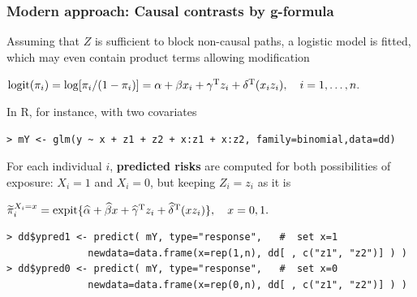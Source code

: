 \documentclass[12pt,dvipsnames,t,aspectratio=169, handout%
]{beamer}
\begin{document}
\begin{frame}[fragile]
\frametitle{\large Modern approach: Causal contrasts by g-formula}

\bi
\item
Assuming that $Z$ is sufficient to block non-causal paths, 
a logistic model is fitted,
which may even contain product terms allowing modification
\begin{center}
$ \text{logit}(\pi_i) = \log[\pi_i/(1-\pi_i)] = 
\alpha + \beta x_i + \gamma^{\small\text{T}} z_i + \delta^{\small\text{T}} (x_i z_i), \quad i=1, \dots, n. $
\end{center}
\medskip
\item
In R, for instance, with two covariates
{\small \color{blue}
\begin{verbatim}
> mY <- glm(y ~ x + z1 + z2 + x:z1 + x:z2, family=binomial,data=dd)
\end{verbatim}
}
\pause
\medskip
\item
For each individual $i$, \textbf{predicted risks} are computed
for both possibilities of exposure: $X_i=1$ and $X_i=0$, but keeping $Z_i=z_i$ as it is
\begin{center}
$ \widetilde{\pi}_i^{X_i=x} = \text{expit}\{ \widehat\alpha + \widehat\beta x + 
   \widehat\gamma^{\small\text{T}} z_i + \widehat\delta^{\small\text{T}} (x z_i)\}, \quad x=0,1 .  $
\end{center}
{\small \color{blue}
\begin{verbatim}
> dd$ypred1 <- predict( mY, type="response",   #  set x=1
              newdata=data.frame(x=rep(1,n), dd[ , c("z1", "z2")] ) )
> dd$ypred0 <- predict( mY, type="response",   #  set x=0
              newdata=data.frame(x=rep(0,n), dd[ , c("z1", "z2")] ) )          
\end{verbatim}
}
\ei
\end{frame}
\end{document}
